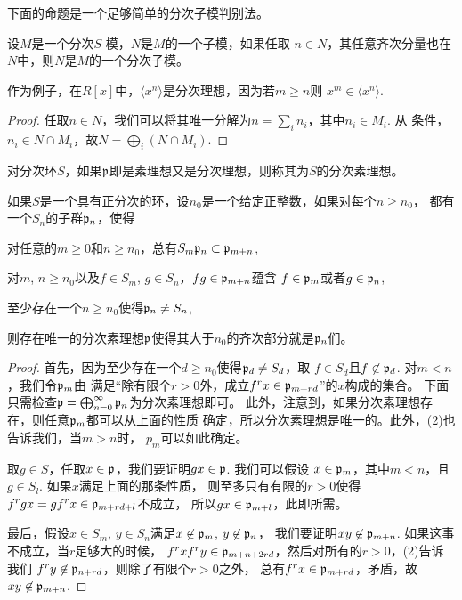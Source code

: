 下面的命题是一个足够简单的分次子模判别法。

\begin{pro}
设$M$是一个分次$S$-模，$N$是$M$的一个子模，如果任取
$n\in N$，其任意齐次分量也在$N$中，则$N$是$M$的一个分次子模。
\end{pro}

作为例子，在$R[x]$中，$\langle x^n\rangle$是分次理想，因为若$m\geq n$则
$x^m\in \langle x^n\rangle$.

\begin{proof}
任取$n\in N$，我们可以将其唯一分解为$n=\sum_i n_i$，其中$n_i\in M_i$. 从
条件，$n_i\in N\cap M_i$，故$N=\bigoplus_i (N\cap M_i)$.
\end{proof}

\begin{para}[分次素理想]
对分次环$S$，如果$\mathfrak{p}$即是素理想又是分次理想，则称其为$S$的分次素理想。
\end{para}

\begin{pro}
如果$S$是一个具有正分次的环，设$n_0$是一个给定正整数，如果对每个$n\geq n_0$，
都有一个$S_n$的子群$\mathfrak{p}_n$，使得
\begin{compactenum}[~~~(1)]
\item 对任意的$m\geq 0$和$n\geq n_0$，总有$S_m\mathfrak{p}_n\subset \mathfrak{p}_{m+n}$,
\item 对$m$, $n\geq n_0$以及$f\in S_m$, $g\in S_n$，$fg\in\mathfrak{p}_{m+n}$蕴含
$f\in\mathfrak{p}_m$或者$g\in \mathfrak{p}_n$,
\item 至少存在一个$n\geq n_0$使得$\mathfrak{p}_n\neq S_n$,
\end{compactenum}
则存在唯一的分次素理想$\mathfrak{p}$使得其大于$n_0$的齐次部分就是$\mathfrak{p}_n$们。
\end{pro}

\begin{proof}
首先，因为至少存在一个$d\geq n_0$使得$\mathfrak{p}_{d} \neq S_{d}$，取
$f\in S_{d}$且$f\not\in \mathfrak{p}_{d}$. 对$m<n$，我们令$\mathfrak{p}_m$由
满足“除有限个$r>0$外，成立$f^rx\in \mathfrak{p}_{m+rd}$”的$x$构成的集合。
下面只需检查$\mathfrak{p}=\bigoplus_{n=0}^\infty \mathfrak{p}_n$为分次素理想即可。
此外，注意到，如果分次素理想存在，则任意$\mathfrak{p}_m$都可以从上面的性质
确定，所以分次素理想是唯一的。此外，(2)也告诉我们，当$m>n$时，
$p_m$可以如此确定。

取$g\in S$，任取$x\in \mathfrak{p}$，我们要证明$gx\in \mathfrak{p}$. 我们可以假设
$x\in \mathfrak{p}_m$，其中$m<n$，且$g\in S_l$. 如果$x$满足上面的那条性质，
则至多只有有限的$r>0$使得$f^rgx=gf^rx\in \mathfrak{p}_{m+rd+l}$不成立，
所以$gx\in \mathfrak{p}_{m+l}$，此即所需。

最后，假设$x\in S_m$, $y\in S_n$满足$x\not\in \mathfrak{p}_m$, $y\not\in \mathfrak{p}_n$，
我们要证明$xy\not\in \mathfrak{p}_{m+n}$. 如果这事不成立，当$r$足够大的时候，
$f^r x f^r y\in \mathfrak{p}_{m+n+2rd}$，然后对所有的$r>0$，(2)告诉我们
$f^ry\not\in \mathfrak{p}_{n+rd}$，则除了有限个$r>0$之外，
总有$f^rx\in \mathfrak{p}_{m+rd}$，矛盾，故$xy\not\in \mathfrak{p}_{m+n}$.
\end{proof}

